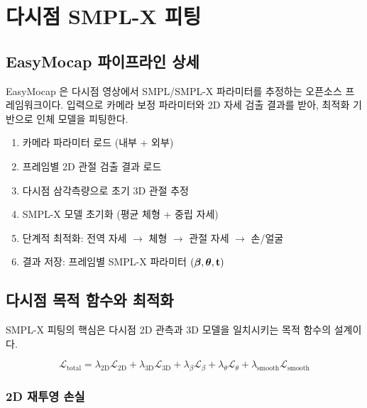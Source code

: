 \documentclass[11pt, a4paper]{report}
\begin{document}
\chapter{다시점 SMPL-X 피팅}

\section{EasyMocap 파이프라인 상세}

EasyMocap \cite{easymocap}은 다시점 영상에서 SMPL/SMPL-X 파라미터를 추정하는 오픈소스 프레임워크이다.
입력으로 카메라 보정 파라미터와 2D 자세 검출 결과를 받아, 최적화 기반으로 인체 모델을 피팅한다.

\begin{pipelinebox}[title={EasyMocap 처리 흐름}]
\begin{enumerate}[nosep]
  \item 카메라 파라미터 로드 (내부 + 외부)
  \item 프레임별 2D 관절 검출 결과 로드
  \item 다시점 삼각측량으로 초기 3D 관절 추정
  \item SMPL-X 모델 초기화 (평균 체형 + 중립 자세)
  \item 단계적 최적화: 전역 자세 $\rightarrow$ 체형 $\rightarrow$ 관절 자세 $\rightarrow$ 손/얼굴
  \item 결과 저장: 프레임별 SMPL-X 파라미터 $(\bm{\beta}, \bm{\theta}, \mathbf{t})$
\end{enumerate}
\end{pipelinebox}

\section{다시점 목적 함수와 최적화}

SMPL-X 피팅의 핵심은 다시점 2D 관측과 3D 모델을 일치시키는 목적 함수의 설계이다.

\begin{equation}
\mathcal{L}_{\text{total}} = \lambda_{\text{2D}} \mathcal{L}_{\text{2D}} + \lambda_{\text{3D}} \mathcal{L}_{\text{3D}} + \lambda_{\beta} \mathcal{L}_{\beta} + \lambda_{\theta} \mathcal{L}_{\theta} + \lambda_{\text{smooth}} \mathcal{L}_{\text{smooth}}
\end{equation}

\subsection{2D 재투영 손실}
\end{document}
